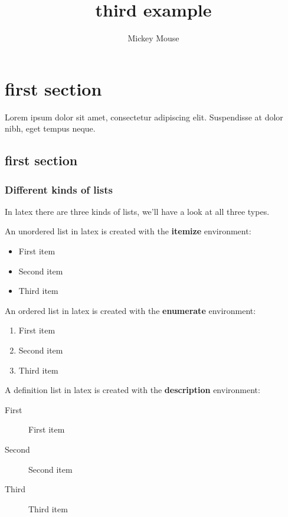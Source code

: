 \documentclass[a4paper]{report}
\author{Mickey Mouse}
\date{}
\title{third example}
\begin{document}
\maketitle

\tableofcontents

\chapter{first section}

Lorem ipsum dolor sit amet, consectetur adipiscing elit. Suspendisse at dolor
nibh, eget tempus neque.


\section{first section}

\subsection{Different kinds of lists}

In latex there are three kinds of lists, we'll have a look at all three types.

An unordered list in latex is created with the \textbf{itemize} environment:

\begin{itemize}
    \item First item
    \item Second item
    \item Third item
\end{itemize}


An ordered list in latex is created with the \textbf{enumerate} environment:

\begin{enumerate}
    \item First item
    \item Second item
    \item Third item
\end{enumerate}


A definition list in latex is created with the \textbf{description} environment:

\begin{description}
    \item[First] First item
    \item[Second] Second item
    \item[Third] Third item
\end{description}
\end{document}
